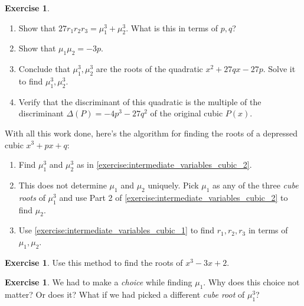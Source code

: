 \documentclass[reqno, 12pt, letter]{article}
\theoremstyle{plain}
\theoremstyle{definition}
\newtheorem{exercise}[theorem]{Exercise}
\theoremstyle{remark}
\numberwithin{equation}{section}
\begin{document}
	\begin{exercise}
		\label{exercise:intermediate_variables_cubic_2}
		$ $ 
		\begin{enumerate}
			\item Show that $27r_1  r_2  r_3 = \mu_1^3 + \mu_2^3$. What is this in terms of $ p, q$?
			\item Show that $ \mu_1 \mu_2 = -3p$.
			\item Conclude that $ \mu_1^3, \mu_2^3$ are the roots of the quadratic $ x^2 + 27qx - 27p$. Solve it to find $ \mu_1^3, \mu_2^3$. 
      \item Verify that the discriminant of this quadratic is the multiple of the discriminant $\Delta(P) = -4p^3 - 27q^2$ of the original cubic $ P(x)$.
		\end{enumerate}
	\end{exercise}
  
	\begin{mdframed}
		With all this work done, here's the algorithm for finding the roots of a depressed cubic $ x^3 + px + q$:
		\begin{enumerate}
			\item Find $ \mu_1^3$ and $ \mu_2^3$ as in \autoref{exercise:intermediate_variables_cubic_2}.
			\item This does not determine $ \mu_1$ and $ \mu_2$ uniquely. Pick $ \mu_1$ as any of the three \emph{cube roots} of $ \mu_1^3$ and use Part 2 of \autoref{exercise:intermediate_variables_cubic_2} to find $ \mu_2$.
			\item Use \autoref{exercise:intermediate_variables_cubic_1} to find $ r_1, r_2, r_3$ in terms of $ \mu_1, \mu_2$. 
		\end{enumerate}
	\end{mdframed}
		\begin{exercise}
			Use this method to find the roots of $x^3 - 3x + 2$.
		\end{exercise}
		
	\begin{exercise}
		\label{exercise:no-choice}
		We had to make a \emph{choice} while finding $ \mu_1$. Why does this choice not matter? Or does it? What if we had picked a different \emph{cube root} of $ \mu_1^3$?
	\end{exercise}
	
\end{document}
